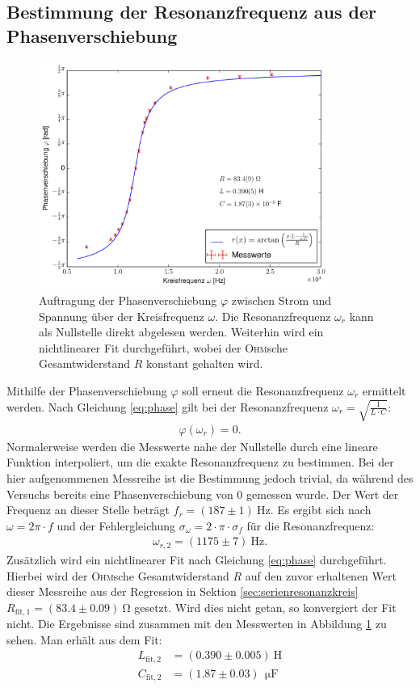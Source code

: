 \documentclass[12pt,a4paper,titlepage,headinclude]{scrartcl}
\numberwithin{equation}{subsection}
\newcommand{\mrm}[1]{\mathrm{#1}}
\newcommand{\person}[1]{\textsc{#1}}
\begin{document}
\subsection{Bestimmung der Resonanzfrequenz aus der Phasenverschiebung}
\label{sec:phasenverschiebung}
\begin{figure}[H]
	\centering
	\includegraphics[width=0.85\textwidth]{plot3.pdf}
	\caption{Auftragung der Phasenverschiebung $\varphi$ zwischen Strom und Spannung über der Kreisfrequenz $\omega$. Die Resonanzfrequenz $\omega_r$ kann als Nullstelle direkt abgelesen werden. Weiterhin wird ein nichtlinearer Fit durchgeführt, wobei der \person{Ohm}sche Gesamtwiderstand $R$ konstant gehalten wird.}
	\label{fig:plot3}
\end{figure}
Mithilfe der Phasenverschiebung $\varphi$ soll erneut die Resonanzfrequenz $\omega_r$ ermittelt werden. Nach Gleichung \eqref{eq:phase} gilt bei der Resonanzfrequenz $\omega_r=\sqrt{\frac{1}{L\cdot C}}$:
	\begin{align}
		\varphi(\omega_r)=0.
		\label{eq:phaseresonanz}
	\end{align}
Normalerweise werden die Messwerte nahe der Nullstelle durch eine lineare Funktion interpoliert, um die exakte Resonanzfrequenz zu bestimmen. Bei der hier aufgenommenen Messreihe ist die Bestimmung jedoch trivial, da während des Versuchs bereits eine Phasenverschiebung von 0 gemessen wurde. Der Wert der Frequenz an dieser Stelle beträgt $f_r=(187\pm1)~$Hz. Es ergibt sich nach $\omega=2\pi\cdot f$ und der Fehlergleichung $\sigma_{\omega}=2 \cdot \pi \cdot \sigma_{f}$ für die Resonanzfrequenz:
\begin{align}
	\omega_{r,2}=(1175\pm7)~\mrm{Hz}.
	\label{eq:resonnanzfrequenz2}
\end{align}
Zusätzlich wird ein nichtlinearer Fit nach Gleichung \eqref{eq:phase} durchgeführt. Hierbei wird der \person{Ohm}sche Gesamtwiderstand $R$ auf den zuvor erhaltenen Wert dieser Messreihe aus der Regression in Sektion \ref{sec:serienresonanzkreis} $R_{\mrm{fit},1}=(83.4\pm0.09)~\mrm{\Omega}$ gesetzt. Wird dies nicht getan, so konvergiert der Fit nicht. Die Ergebnisse sind zusammen mit den Messwerten in Abbildung \ref{fig:plot3} zu sehen. Man erhält aus dem Fit:
\begin{align}
	L_{\mrm{fit},2}&=(0.390\pm0.005)~\mrm{H}
	\label{eq:Lfit2}\\
	C_{\mrm{fit},2}&=(1.87\pm0.03)~\SI{}{\micro\farad}
	\label{eq:Cfit2}
\end{align}
\end{document}
